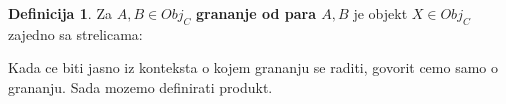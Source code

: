 \documentclass[11pt]{article}
\theoremstyle{definition}
\newtheorem{definition}{Definicija}
\begin{document}
  \begin{definition}
    Za $A, B \in Obj_C$ \textbf{grananje od para $A, B$} je objekt $X \in
    Obj_C$
    zajedno sa strelicama:
  \begin{center}
  \end{center}
  \end{definition}
  Kada ce biti jasno iz konteksta o kojem grananju se raditi, govorit cemo
  samo o grananju. Sada mozemo definirati produkt.
\end{document}
